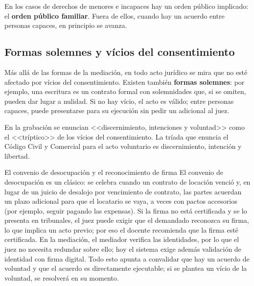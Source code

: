 \documentclass[12pt,oneside]{book}
\begin{document}

En los casos de derechos de menores e incapaces hay un orden p\'ublico implicado: el \textbf{orden p\'ublico familiar}. Fuera de ellos, cuando hay un acuerdo entre personas capaces, en principio se avanza.

\subsection{Formas solemnes y v\'icios del consentimiento}

M\'as all\'a de las formas de la mediaci\'on, en todo acto jur\'idico se mira que no est\'e afectado por v\'icios del consentimiento. Existen tambi\'en \textbf{formas solemnes}: por ejemplo, una escritura es un contrato formal con solemnidades que, si se omiten, pueden dar lugar a nulidad. Si no hay v\'icio, el acto es v\'alido; entre personas capaces, puede presentarse para su ejecuci\'on sin pedir un adicional al juez.

\begin{note}
En la grabaci\'on se enuncian <<discernimiento, intenciones y voluntad>> como el <<tr\'iptico>> de los v\'icios del consentimiento. La tr\'iada que enuncia el C\'odigo Civil y Comercial para el acto voluntario es discernimiento, intenci\'on y libertad.
\end{note}

\begin{example}{El convenio de desocupaci\'on y el reconocimiento de firma}
El convenio de desocupaci\'on es un cl\'asico: se celebra cuando un contrato de locaci\'on venci\'o y, en lugar de un juicio de desalojo por vencimiento de contrato, las partes acuerdan un plazo adicional para que el locatario se vaya, a veces con pactos accesorios (por ejemplo, seguir pagando las expensas). Si la firma no est\'a certificada y se lo presenta en tribunales, el juez puede exigir que el demandado reconozca su firma, lo que implica un acto previo; por eso el docente recomienda que la firma est\'e certificada. En la mediaci\'on, el mediador verifica las identidades, por lo que el juez no necesita redundar sobre ello; hoy el sistema exige adem\'as validaci\'on de identidad con firma digital. Todo esto apunta a convalidar que hay un acuerdo de voluntad y que el acuerdo es directamente ejecutable; si se plantea un v\'icio de la voluntad, se resolver\'a en su momento.
\end{example}
\end{document}
